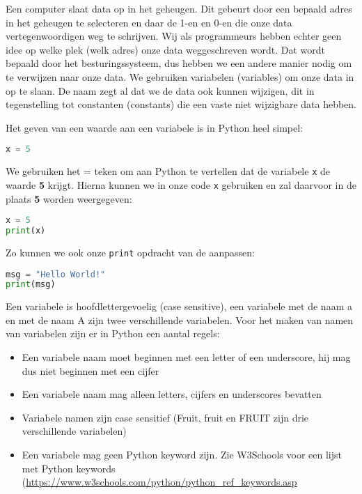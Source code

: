 Een computer slaat data op in het geheugen. Dit gebeurt door een bepaald adres in het geheugen te selecteren en daar de 1-en en 0-en die onze data vertegenwoordigen weg te schrijven. Wij als programmeurs hebben echter geen idee op welke plek (welk adres) onze data weggeschreven wordt. Dat wordt bepaald door het besturingssysteem, dus hebben we een andere manier nodig om te verwijzen naar onze data. We gebruiken variabelen (variables) om onze data in op te slaan. De naam  zegt al dat we de data ook kunnen wijzigen, dit in tegenstelling tot constanten (constants) die een vaste niet wijzigbare data hebben.

Het geven van een waarde aan een variabele is in Python heel simpel:
\begin{lstlisting}[language=python]
x = 5
\end{lstlisting}
We gebruiken het = teken om aan Python te vertellen dat de variabele \texttt{x} de waarde \textbf{5} krijgt. Hierna kunnen we in onze code \texttt{x} gebruiken en zal daarvoor in de plaats \textbf{5} worden weergegeven:
\begin{lstlisting}[language=python]
x = 5
print(x)
\end{lstlisting}
Zo kunnen we ook onze \texttt{print} opdracht van de  aanpassen:
\begin{lstlisting}[language=python]
msg = "Hello World!"
print(msg)
\end{lstlisting}

Een variabele is hoofdlettergevoelig (case sensitive), een variabele met de naam a en met de naam A zijn twee verschillende variabelen. Voor het maken van namen van variabelen zijn er in Python een aantal regels:
\begin{itemize}
	\item Een variabele naam moet beginnen met een letter of een underscore, hij mag dus niet beginnen met een cijfer
	\item Een variabele naam mag alleen letters, cijfers en underscores bevatten
	\item Variabele namen zijn case sensitief (Fruit, fruit en FRUIT zijn drie verschillende variabelen)
	\item Een variabele mag geen Python keyword zijn. Zie W3Schools voor een lijst met Python keywords (\url{https://www.w3schools.com/python/python_ref_keywords.asp}
\end{itemize}

